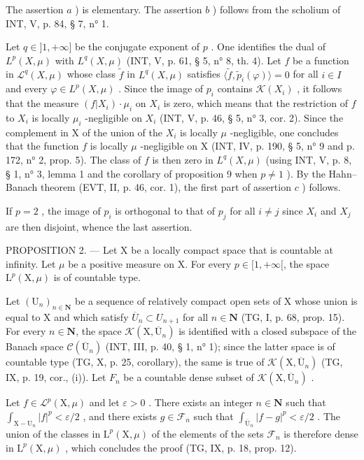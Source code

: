 The assertion \(a\) ) is elementary. The assertion \(b\) ) follows from the scholium of INT, V, p. 84, § 7, n° 1.

Let \(q \in ]1, +\infty]\) be the conjugate exponent of \(p\) . One identifies the dual of \(L^p(X, \mu)\) with \(L^q(X, \mu)\) (INT, V, p. 61, § 5, n° 8, th. 4). Let \(f\) be a function in \(\mathcal{L}^q(X, \mu)\) whose class \(\widetilde{f}\) in \(L^q(X, \mu)\) satisfies \(\langle \widetilde{f}, \widetilde{p}_i(\varphi) \rangle = 0\) for all \(i \in I\) and every \(\varphi \in L^p(X, \mu)\) . Since the image of \(p_i\) contains \(\mathcal{K}(X_i)\) , it follows that the measure \((f|X_i) \cdot \mu_i\) on \(X_i\) is zero, which means that the restriction of \(f\) to \(X_i\) is locally \(\mu_i\) -negligible on \(X_i\) (INT, V, p. 46, § 5, n° 3, cor. 2). Since the complement in X of the union of the \(X_i\) is locally \(\mu\) -negligible, one concludes that the function \(f\) is locally \(\mu\) -negligible on X (INT, IV, p. 190, § 5, n° 9 and p. 172, n° 2, prop. 5). The class of \(f\) is then zero in \(L^q(X, \mu)\) (using INT, V, p. 8, § 1, n° 3, lemma 1 and the corollary of proposition 9 when \(p \neq 1\) ). By the Hahn--Banach theorem (EVT, II, p. 46, cor. 1), the first part of assertion \(c\) ) follows.

If \(p = 2\) , the image of \(p_i\) is orthogonal to that of \(p_j\) for all \(i \neq j\) since \(X_i\) and \(X_j\) are then disjoint, whence the last assertion.

PROPOSITION 2. --- Let X be a locally compact space that is countable at infinity. Let \(\mu\) be a positive measure on X. For every \(p \in [1, +\infty[\), the space \(\mathrm{L}^{p}(\mathrm{X},\mu)\) is of countable type.

Let \((\mathrm{U}_{n})_{n\in\mathbf{N}}\) be a sequence of relatively compact open sets of X whose union is equal to X and which satisfy \(\overline{U}_{n}\subset U_{n+1}\) for all \(n\in\mathbf{N}\) (TG, I, p. 68, prop. 15). For every \(n\in\mathbf{N}\), the space \(\mathcal{K}(\mathrm{X},\overline{\mathrm{U}}_{n})\) is identified with a closed subspace of the Banach space \(\mathcal{C}(\overline{\mathrm{U}}_{n})\) (INT, III, p. 40, § 1, n° 1); since the latter space is of countable type (TG, X, p. 25, corollary), the same is true of \(\mathcal{K}(\mathrm{X},\overline{\mathrm{U}}_{n})\) (TG, IX, p. 19, cor., (i)). Let \(F_{n}\) be a countable dense subset of \(\mathcal{K}(\mathrm{X},\overline{\mathrm{U}}_{n})\) .

Let \(f \in \mathcal{L}^p(\mathrm{X},\mu)\) and let \(\varepsilon > 0\) . There exists an integer \(n \in \mathbf{N}\) such that \(\int_{\mathrm{X}-\mathrm{U}_n}|f|^p < \varepsilon / 2\) , and there exists \(g \in \mathcal{F}_n\) such that \(\int_{\overline{\mathrm{U}}_n}|f - g|^p < \varepsilon / 2\) . The union of the classes in \(\mathrm{L}^p(\mathrm{X},\mu)\) of the elements of the sets \(\mathcal{F}_n\) is therefore dense in \(\mathrm{L}^p(\mathrm{X},\mu)\) , which concludes the proof (TG, IX, p. 18, prop. 12).

